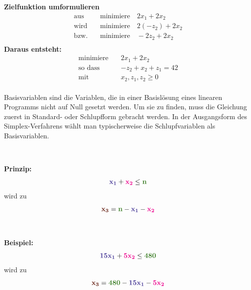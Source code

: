 \documentclass{article}
\begin{document}
\textbf{Zielfunktion umformulieren}
\begin{align*}
    \text{aus} \quad & \text{minimiere} \quad  2x_1 + 2x_2 \\
    \text{wird} \quad & \text{minimiere} \quad  2(-z_2) + 2x_2 \\
    \text{bzw.} \quad & \text{minimiere} \quad  -2z_2 + 2x_2 \\
\end{align*}
\textbf{Daraus entsteht:}
\begin{align*}
    \text{minimiere} \quad &   2x_1 + 2x_2 \\
    \text{so dass} \quad & -z_2 + x_2 + z_1 =    42 \\
    \text{mit} \quad & x_2, z_1, z_2 \geq 0 \\
\end{align*}
\noindent
\begin{minipage}{7cm}
\begin{definitionbox}[title=Basisvariablen]
Basisvariablen sind die Variablen, die in einer Basislösung eines linearen Programms nicht auf Null gesetzt werden. \newline
Um sie zu finden, muss die Gleichung zuerst in Standard- oder Schlupfform gebracht werden. \newline
In der Ausgangsform des Simplex-Verfahrens wählt man typischerweise die Schlupfvariablen als Basisvariablen. \newline 

\end{definitionbox}
\end{minipage}
\begin{minipage}{0.5cm}
$\ $
\end{minipage}
\begin{minipage}{10.5cm}
\begin{action}[title=Umwandlung in Schlupfform]
\begin{minipage}{4cm} 
\textbf{Prinzip:}
\[
\mathbf{\textcolor{BlueViolet}{x_1}} + 
\mathbf{\textcolor{Magenta}{x_2}} \leq
\mathbf{\textcolor{OliveGreen}{n}}
\]
wird zu
\[
\mathbf{\textcolor{Sepia}{x_3}} = \mathbf{\textcolor{OliveGreen}{n}} - 
\mathbf{\textcolor{BlueViolet}{x_1}} - 
\mathbf{\textcolor{Magenta}{x_2}} 
\]
\end{minipage}
\begin{minipage}{0.5cm}
$\ $
\end{minipage}
\begin{minipage}{4cm}
\textbf{Beispiel:} \cite{folien5}
\[
\mathbf{\textcolor{BlueViolet}{15x_1}} + 
\mathbf{\textcolor{Magenta}{5x_2}} \leq
\mathbf{\textcolor{OliveGreen}{480}}
\]
wird zu
\[
\mathbf{\textcolor{Sepia}{x_3}} = \mathbf{\textcolor{OliveGreen}{480}} - 
\mathbf{\textcolor{BlueViolet}{15x_1}} - 
\mathbf{\textcolor{Magenta}{5x_2}} 
\]
\end{minipage}
\end{action}
\end{minipage} 
\end{document}
